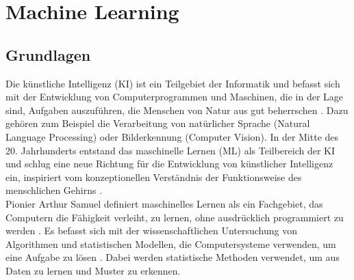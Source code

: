 \documentclass[german,bachelor]{swsLeipzig}
\begin{document}
\section{Machine Learning}

\subsection{Grundlagen}
Die künstliche Intelligenz (KI) ist ein Teilgebiet der Informatik und befasst sich mit der Entwicklung von Computerprogrammen und Maschinen,
die in der Lage sind, Aufgaben auszuführen, die Menschen von Natur aus gut beherrschen \cite[S. 1]{2020}.
Dazu gehören zum Beispiel die Verarbeitung von natürlicher Sprache (Natural Language Processing) oder Bilderkennung (Computer Vision).
In der Mitte des 20. Jahrhunderts entstand das maschinelle Lernen (ML) als Teilbereich der KI und schlug eine neue Richtung
für die Entwicklung von künstlicher Intelligenz ein, inspiriert vom konzeptionellen Verständnis der Funktionsweise des menschlichen Gehirns \cite[S. 1]{2020}.\\

Pionier Arthur Samuel definiert maschinelles Lernen als ein Fachgebiet, das Computern die Fähigkeit verleiht, zu lernen,
ohne ausdrücklich programmiert zu werden \cite[S. 381]{mahesh2020machine}.
Es befasst sich mit der wissenschaftlichen Untersuchung von Algorithmen und statistischen Modellen,
die Computersysteme verwenden, um eine Aufgabe zu lösen \cite[S. 381]{mahesh2020machine}.
Dabei werden statistische Methoden verwendet, um aus Daten zu lernen und Muster zu erkennen. \\

\end{document}
